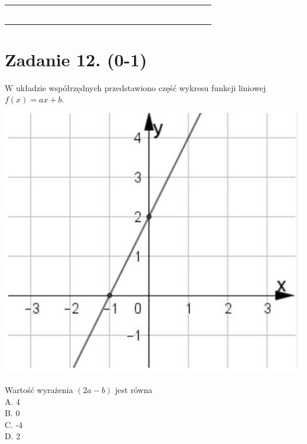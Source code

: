\documentclass[10pt]{article}
\begin{document}
\begin{center}
\begin{tabular}{|c|c|c|c|c|c|c|c|c|c|c|c|c|c|c|c|c|c|c|c|c|c|c|c|c|}
 &  &  &  &  &  &  &  &  &  &  &  &  &  &  &  &  &  &  &  &  &  &  &  \\
\hline
 &  &  &  &  &  &  &  &  &  &  &  &  &  &  &  &  &  &  &  &  &  &  &  &  \\
\hline
 &  &  &  &  &  &  &  &  &  &  &  &  &  &  &  &  &  &  &  &  &  &  &  &  \\
\hline
 &  &  &  &  &  &  &  &  &  &  &  &  &  &  &  &  &  &  &  &  &  &  &  &  \\
\hline
 &  &  &  &  &  &  &  &  &  &  &  &  &  &  &  &  &  &  &  &  &  &  &  &  \\
\hline
 &  &  &  &  &  &  &  &  &  &  &  &  &  &  &  &  &  &  &  &  &  &  &  &  \\
\hline
 &  &  &  &  &  &  &  &  &  &  &  &  &  &  &  &  &  &  &  &  &  &  &  &  \\
\hline
\end{tabular}
\end{center}

\section*{Zadanie 12. (0-1)}
W układzie współrzędnych przedstawiono część wykresu funkcji liniowej \(f(x)=a x+b\).\\
\includegraphics[max width=\textwidth, center]{2024_11_21_ba65d61981011633d840g-06}

Wartość wyrażenia \((2 a-b)\) jest równa\\
A. 4\\
B. 0\\
C. -4\\
D. 2
\end{document}
